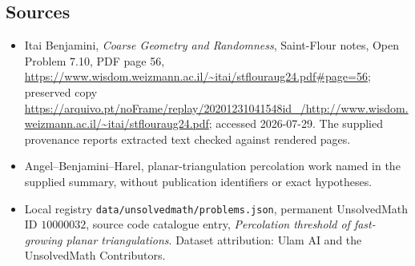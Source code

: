 \documentclass[11pt]{article}
\begin{document}
\subsection{Sources}
\begin{itemize}
\item Itai Benjamini, \emph{Coarse Geometry and Randomness}, Saint-Flour notes, Open Problem 7.10, PDF page 56, \url{https://www.wisdom.weizmann.ac.il/~itai/stflouraug24.pdf#page=56}; preserved copy \url{https://arquivo.pt/noFrame/replay/20201231041548id_/http://www.wisdom.weizmann.ac.il/~itai/stflouraug24.pdf}; accessed 2026-07-29. The supplied provenance reports extracted text checked against rendered pages.
\item Angel--Benjamini--Harel, planar-triangulation percolation work named in the supplied summary, without publication identifiers or exact hypotheses.
\item Local registry \texttt{data/unsolvedmath/problems.json}, permanent UnsolvedMath ID $10000032$, source code catalogue entry, \emph{Percolation threshold of fast-growing planar triangulations}. Dataset attribution: Ulam AI and the UnsolvedMath Contributors.
\end{itemize}
\end{document}
